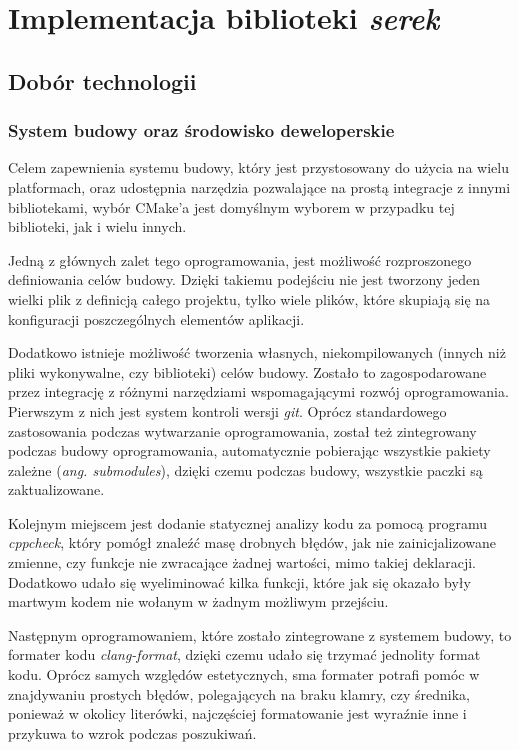 \documentclass[12pt]{article}
\newcommand{\n}{\newline}
\begin{document}
	{
		\section{Implementacja biblioteki {\it serek}}

		{
			\subsection{Dobór technologii}

			{
				\subsubsection{System budowy oraz środowisko deweloperskie}

				Celem zapewnienia systemu budowy, który jest przystosowany do użycia na wielu platformach, oraz udostępnia narzędzia pozwalające na prostą
				integracje z innymi bibliotekami, wybór CMake'a\cite{cmake_docs} jest domyślnym wyborem w przypadku tej biblioteki, jak i wielu innych.\n

				Jedną z głównych zalet tego oprogramowania, jest możliwość rozproszonego definiowania celów budowy. Dzięki takiemu podejściu nie jest tworzony
				jeden wielki plik z definicją całego projektu, tylko wiele plików, które skupiają się na konfiguracji poszczególnych elementów aplikacji.\n

				Dodatkowo istnieje możliwość tworzenia własnych, niekompilowanych (innych niż pliki wykonywalne, czy biblioteki) celów budowy. Zostało to zagospodarowane
				przez integrację z różnymi narzędziami wspomagającymi rozwój oprogramowania. Pierwszym z nich jest system kontroli wersji {\it git}\cite{git_docs}. Oprócz standardowego
				zastosowania podczas wytwarzanie oprogramowania, został też zintegrowany podczas budowy oprogramowania, automatycznie pobierając wszystkie pakiety zależne
				({\it ang. submodules}), dzięki czemu podczas budowy, wszystkie paczki są zaktualizowane.\n

				Kolejnym miejscem jest dodanie statycznej analizy kodu za pomocą programu {\it cppcheck}\cite{cppcheck_repo}, który pomógł znaleźć masę drobnych błędów,
				jak nie zainicjalizowane zmienne, czy funkcje nie zwracające żadnej wartości, mimo takiej deklaracji. Dodatkowo udało się wyeliminować kilka funkcji,
				które jak się okazało były martwym kodem nie wołanym w żadnym możliwym przejściu.\n

				Następnym oprogramowaniem, które zostało zintegrowane z systemem budowy, to formater kodu {\it clang-format}\cite{clangformat_docs}, dzięki czemu
				udało się trzymać jednolity format kodu. Oprócz samych względów estetycznych, sma formater potrafi pomóc w znajdywaniu prostych błędów, polegających
				na braku klamry, czy średnika, ponieważ w okolicy literówki, najczęściej formatowanie jest wyraźnie inne i przykuwa to wzrok podczas poszukiwań.\n

}}}
\end{document}
